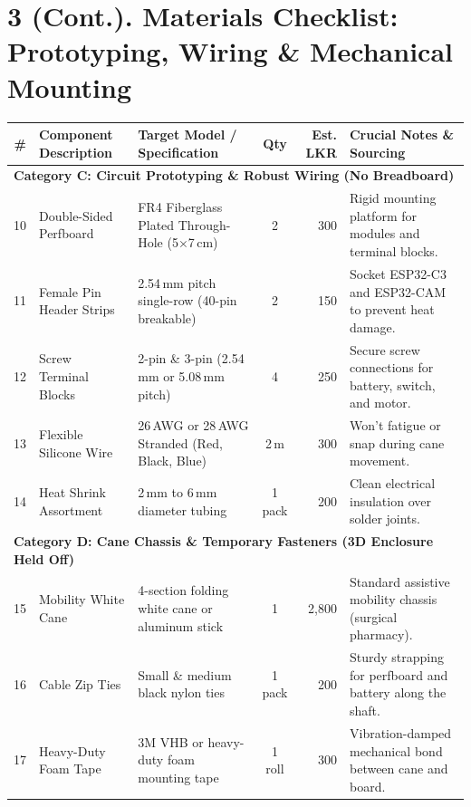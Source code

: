 \documentclass[10pt,a4paper]{article}
\begin{document}
\section{3 (Cont.). Materials Checklist: Prototyping, Wiring \& Mechanical Mounting}
\small
\begin{tabularx}{\textwidth}{rXlcrX}
\toprule
\textbf{\#} & \textbf{Component Description} & \textbf{Target Model / Specification} & \textbf{Qty} & \textbf{Est. LKR} & \textbf{Crucial Notes \& Sourcing} \\
\midrule
\multicolumn{6}{l}{\textbf{\color{primary}Category C: Circuit Prototyping \& Robust Wiring (No Breadboard)}} \\
10 & Double-Sided Perfboard & FR4 Fiberglass Plated Through-Hole (5$\times$7\,cm) & 2 & 300 & Rigid mounting platform for modules and terminal blocks. \\
11 & Female Pin Header Strips & 2.54\,mm pitch single-row (40-pin breakable) & 2 & 150 & Socket ESP32-C3 and ESP32-CAM to prevent heat damage. \\
12 & Screw Terminal Blocks & 2-pin \& 3-pin (2.54\,mm or 5.08\,mm pitch) & 4 & 250 & Secure screw connections for battery, switch, and motor. \\
13 & Flexible Silicone Wire & 26\,AWG or 28\,AWG Stranded (Red, Black, Blue) & 2\,m & 300 & Won't fatigue or snap during cane movement. \\
14 & Heat Shrink Assortment & 2\,mm to 6\,mm diameter tubing & 1 pack & 200 & Clean electrical insulation over solder joints. \\
\midrule
\multicolumn{6}{l}{\textbf{\color{primary}Category D: Cane Chassis \& Temporary Fasteners (3D Enclosure Held Off)}} \\
15 & Mobility White Cane & 4-section folding white cane or aluminum stick & 1 & 2,800 & Standard assistive mobility chassis (surgical pharmacy). \\
16 & Cable Zip Ties & Small \& medium black nylon ties & 1 pack & 200 & Sturdy strapping for perfboard and battery along the shaft. \\
17 & Heavy-Duty Foam Tape & 3M VHB or heavy-duty foam mounting tape & 1 roll & 300 & Vibration-damped mechanical bond between cane and board. \\
\bottomrule
\end{tabularx}
\end{document}
